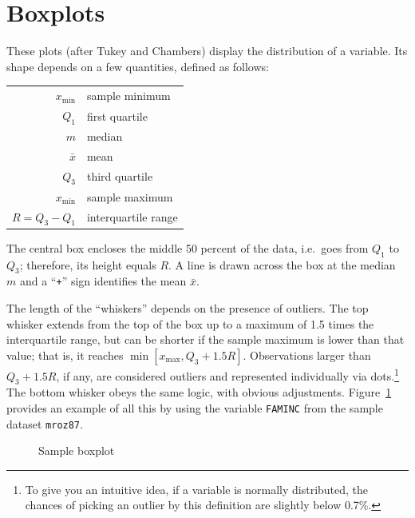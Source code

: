 \pagebreak[4]

\section{Boxplots}
\label{sect-boxplots}

These plots (after Tukey and Chambers) display the distribution of a
variable. Its shape depends on a few quantities, defined as follows:

\begin{center}
\begin{tabular}{rl}
  $x_{\mathrm{min}}$ & sample minimum \\
  $Q_1$ & first quartile \\
  $m$ & median \\
  $\bar{x}$ & mean \\
  $Q_3$ & third quartile \\
  $x_{\mathrm{min}}$ & sample maximum\\
  $R = Q_3 - Q_1$ & interquartile range\\
\end{tabular}
\end{center}

The central box encloses the middle 50 percent of the data, i.e.\ goes
from $Q_1$ to $Q_3$; therefore, its height equals $R$.  A line
is drawn across the box at the median $m$ and a ``\texttt{+}'' sign
identifies the mean $\bar{x}$.

The length of the ``whiskers'' depends on the presence of
outliers. The top whisker extends from the top of the box up to a
maximum of 1.5 times the interquartile range, but can be shorter if
the sample maximum is lower than that value; that is, it reaches
$\min[x_{\mathrm{max}}, Q_3 + 1.5 R]$. Observations larger than
$Q_3 + 1.5 R$, if any, are considered outliers and represented
individually via dots.\footnote{To give you an intuitive idea, if a
  variable is normally distributed, the chances of picking an outlier
  by this definition are slightly below 0.7\%.} The bottom whisker
obeys the same logic, with obvious adjustments.
Figure~\ref{fig-boxplot} provides an example of all this by using the
variable \texttt{FAMINC} from the sample dataset \texttt{mroz87}.

\begin{figure}[htbp]
  \begin{flushleft}
    \hspace{1cm}
  
  \end{flushleft}
  \caption{Sample boxplot}
  \label{fig-boxplot}
\end{figure}

